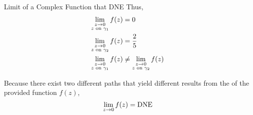 \begin{example}[Lecture 5]{Limit of a Complex Function that DNE}
  Thus,
  \begin{align*}
    \lim\limits_{\substack{z \to 0 \\ z \text{ on } \gamma_{1}}} f(z) &= 0 \\
    \lim\limits_{\substack{z \to 0 \\ z \text{ on } \gamma_{2}}} f(z) &= \frac{2}{5} \\
    \lim\limits_{\substack{z \to 0 \\ z \text{ on } \gamma_{1}}} f(z) &\neq \lim\limits_{\substack{z \to 0 \\ z \text{ on } \gamma_{2}}} f(z)
  \end{align*}

  Because there exist two different paths that yield different results from the  of the provided function $f(z)$,
  \begin{equation*}
    \lim\limits_{z \to 0} f(z) = \mathrm{DNE}
  \end{equation*}
\end{example}


